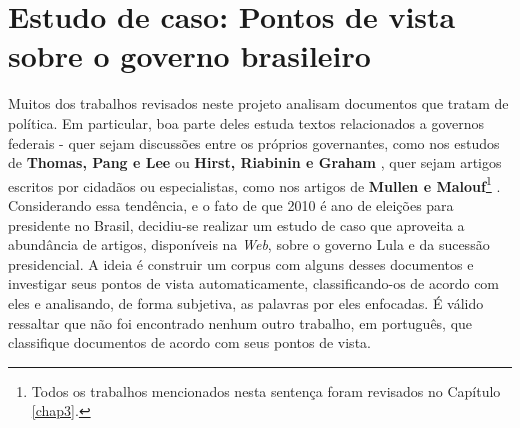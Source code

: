 \chapter{Estudo de caso: Pontos de vista sobre o governo brasileiro}
\label{estudo}



Muitos dos trabalhos revisados neste projeto analisam documentos que tratam de política. Em particular, boa parte deles estuda textos relacionados a governos federais - quer sejam discussões entre os próprios governantes, como nos estudos de \textbf{Thomas, Pang e Lee} \cite{get-out-the-vote} ou \textbf{Hirst, Riabinin e Graham} \cite{hirst-et-al}, quer sejam artigos escritos por cidadãos ou especialistas, como nos artigos de \textbf{Mullen e Malouf}\footnote{Todos os trabalhos mencionados nesta sentença foram revisados no Capítulo \ref{chap3}.} \cite{aaai-politics} \cite{malouf-taking_sides}. Considerando essa tendência, e o fato de que 2010 é ano de eleições para presidente no Brasil, decidiu-se realizar um estudo de caso que aproveita a abundância de artigos, disponíveis na \emph{Web}, sobre o governo Lula e da sucessão presidencial. A ideia é construir um corpus com alguns desses documentos e investigar seus pontos de vista automaticamente, classificando-os de acordo com eles e analisando, de forma subjetiva, as palavras por eles enfocadas. É válido ressaltar que não foi encontrado nenhum outro trabalho, em português, que classifique documentos de acordo com seus pontos de vista.

